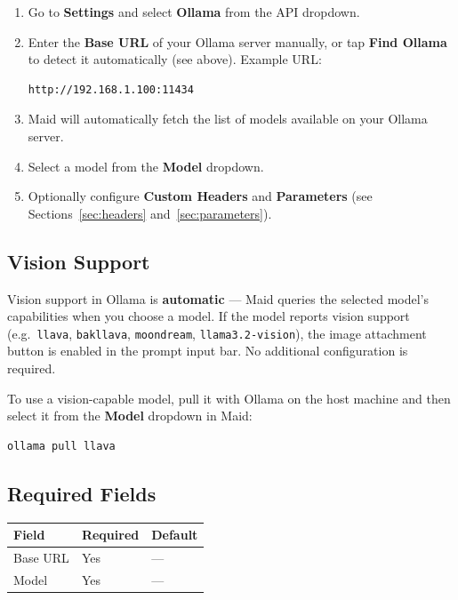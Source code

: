 \documentclass[12pt,a4paper]{article}
\begin{document}
\begin{enumerate}
    \item Go to \textbf{Settings} and select \textbf{Ollama} from the API dropdown.
    \item Enter the \textbf{Base URL} of your Ollama server manually, or tap \textbf{Find Ollama} to detect it automatically (see above). Example URL:
\begin{lstlisting}
http://192.168.1.100:11434
\end{lstlisting}
    \item Maid will automatically fetch the list of models available on your Ollama server.
    \item Select a model from the \textbf{Model} dropdown.
    \item Optionally configure \textbf{Custom Headers} and \textbf{Parameters} (see Sections~\ref{sec:headers} and~\ref{sec:parameters}).
\end{enumerate}

\subsection{Vision Support}

Vision support in Ollama is \textbf{automatic} — Maid queries the selected model's capabilities when you choose a model. If the model reports vision support (e.g.\ \texttt{llava}, \texttt{bakllava}, \texttt{moondream}, \texttt{llama3.2-vision}), the image attachment button is enabled in the prompt input bar. No additional configuration is required.

To use a vision-capable model, pull it with Ollama on the host machine and then select it from the \textbf{Model} dropdown in Maid:

\begin{lstlisting}[language=bash]
ollama pull llava
\end{lstlisting}

\subsection{Required Fields}

\begin{center}
\begin{tabular}{lll}
\toprule
\textbf{Field} & \textbf{Required} & \textbf{Default} \\
\midrule
Base URL & Yes & — \\
Model    & Yes & — \\
\bottomrule
\end{tabular}
\end{center}
\end{document}
